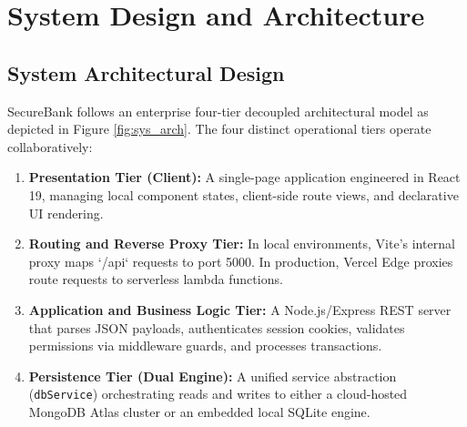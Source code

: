 \chapter{System Design and Architecture}

\section{System Architectural Design}
SecureBank follows an enterprise four-tier decoupled architectural model as depicted in Figure \ref{fig:sys_arch}. The four distinct operational tiers operate collaboratively:

\begin{enumerate}
    \item \textbf{Presentation Tier (Client):} A single-page application engineered in React 19, managing local component states, client-side route views, and declarative UI rendering.
    \item \textbf{Routing and Reverse Proxy Tier:} In local environments, Vite's internal proxy maps `/api` requests to port 5000. In production, Vercel Edge proxies route requests to serverless lambda functions.
    \item \textbf{Application and Business Logic Tier:} A Node.js/Express REST server that parses JSON payloads, authenticates session cookies, validates permissions via middleware guards, and processes transactions.
    \item \textbf{Persistence Tier (Dual Engine):} A unified service abstraction (\texttt{dbService}) orchestrating reads and writes to either a cloud-hosted MongoDB Atlas cluster or an embedded local SQLite engine.
\end{enumerate}

